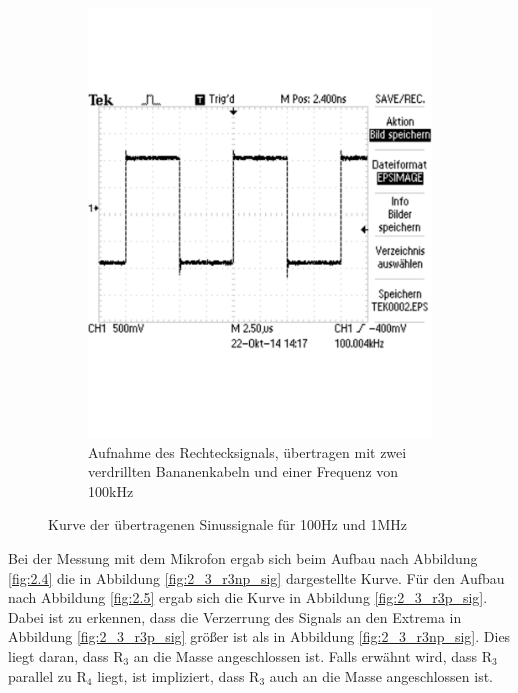 \documentclass[12pt,a4paper]{article}
\begin{document}
\begin{figure}[H]
\begin{subfigure}[tb]{0.48\textwidth}
                \includegraphics[trim = 0mm 0mm
                0mm 5mm ,width=\textwidth , scale = 0.4]{2_3_vgl_1.pdf}
                \caption[Aufnahme des Rechtecksignals, übertragen mit zwei verdrillten Bananenkabeln und einer Frequenz von 100kHz]{Aufnahme des Rechtecksignals, übertragen mit zwei verdrillten Bananenkabeln und einer Frequenz von 100kHz}
 				\label{fig:2_3_vgl_1}
        \end{subfigure}
        \caption{Kurve der übertragenen Sinussignale für 100Hz und 1MHz}
        \label{fig:2_3_rech_vergleich_ohne_mikro}
\end{figure}
\newpage

Bei der Messung mit dem Mikrofon ergab sich beim Aufbau nach Abbildung \ref{fig:2.4} die in Abbildung \ref{fig:2_3_r3np_sig} dargestellte Kurve. Für den Aufbau nach Abbildung \ref{fig:2.5} ergab sich die Kurve in Abbildung \ref{fig:2_3_r3p_sig}. Dabei ist zu erkennen, dass die Verzerrung des Signals an den Extrema in Abbildung \ref{fig:2_3_r3p_sig} größer ist als in Abbildung \ref{fig:2_3_r3np_sig}. Dies liegt daran, dass R$_3$ an die Masse angeschlossen ist.
Falls erwähnt wird, dass R$_3$ parallel zu R$_4$ liegt, ist impliziert, dass R$_3$ auch an die Masse angeschlossen ist.
\end{document}
